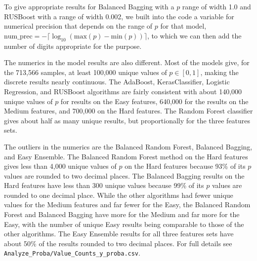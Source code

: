 To give appropriate results for Balanced Bagging with a $p$ range of width 1.0 and RUSBoost with a range of width 0.002, we built into the code a variable for numerical precision that depends on the range of $p$ for that model, $\text{num\_prec} = - \lceil \log_{10} ( \text{max}(p) - \text{min}(p) )  \rceil$, to which we can then add the number of digits appropriate for the purpose.  

The numerics in the model results are also different.  Most of the models give, for the 713,566 samples, at least 100,000 unique values of $p \in [0,1]$, making the discrete results nearly continuous.  The AdaBoost, KerasClassifier, Logistic Regression, and RUSBoost algorithms are fairly consistent with about 140,000 unique values of $p$ for results on the Easy features, 640,000 for the results on the Medium features, and 700,000 on the Hard features.  The Random Forest classifier gives about half as many unique results, but proportionally for the three features sets.

The outliers in the numerics are the Balanced Random Forest, Balanced Bagging, and Easy Ensemble.  The Balanced Random Forest method on the Hard features gives less than 4,000 unique values of $p$ on the Hard features because 93\% of its $p$ values are rounded to two decimal places.  The Balanced Bagging results on the Hard features have less than 300 unique values because 99\% of its $p$ values are rounded to one decimal place.  While the other algorithms had fewer unique values for the Medium features and far fewer for the Easy, the Balanced Random Forest and Balanced Bagging have more for the Medium and far more for the Easy, with the number of unique Easy results being comparable to those of the other algorithms.  The Easy Ensemble results for all three features sets have about 50\% of the results rounded to two decimal places.  For full details see \verb|Analyze_Proba/Value_Counts_y_proba.csv|.







\FloatBarrier

